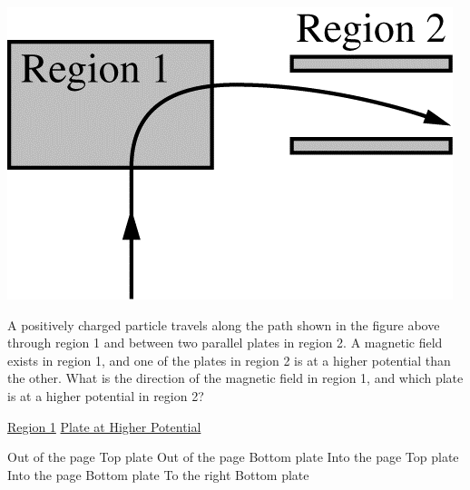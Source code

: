 
\begin{center}
    \includegraphics[scale=0.3]{images/img-009-016.png}
\end{center}

\begin{questions}
\setcounter{question}{14}
\question
A positively charged particle travels along the path shown in the figure above through region 1 and between two parallel plates in region 2. A magnetic field exists in region 1, and one of the plates in region 2 is at a higher potential than the other. What is the direction of the magnetic field in region 1, and which plate is at a higher potential in region 2?

\tabto{0.75cm}\underline{Region 1}
\tabto{4.00cm}\underline{Plate at Higher Potential}

\begin{choices}
    \choice Out of the page \tabto{3.25cm} Top plate
    \choice Out of the page \tabto{3.25cm} Bottom plate
    \choice Into the page   \tabto{3.25cm} Top plate
    \choice Into the page   \tabto{3.25cm} Bottom plate
    \choice To the right    \tabto{3.25cm} Bottom plate
\end{choices}
\end{questions}
